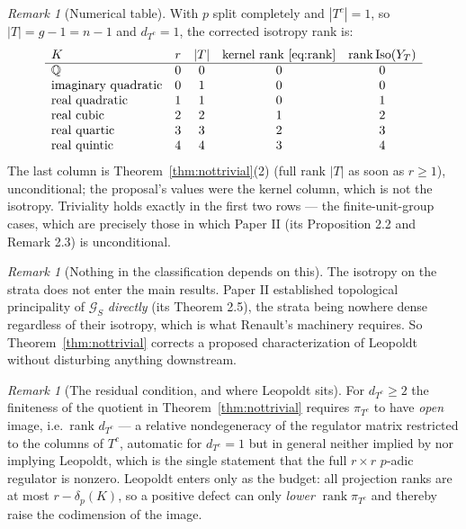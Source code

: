 \documentclass[11pt]{amsart}
\numberwithin{equation}{section}
\theoremstyle{definition}
\theoremstyle{remark}
\newtheorem{remark}[theorem]{Remark}
\newcommand{\Q}{\mathbb{Q}}
\newcommand{\cG}{\mathcal{G}}
\newcommand{\Iso}{\operatorname{Iso}}
\newcommand{\rank}{\operatorname{rank}}
\begin{document}
\begin{remark}[Numerical table]\label{rem:table}
With $p$ split completely and $|T^c|=1$, so $|T|=g-1=n-1$ and $d_{T^c}=1$, the corrected
isotropy rank is:
\[
\begin{array}{lcccc}
K & r & |T| & \text{kernel rank \eqref{eq:rank}} & \rank\Iso(Y_T)\\\hline
\Q & 0 & 0 & 0 & 0\\
\text{imaginary quadratic} & 0 & 1 & 0 & 0\\
\text{real quadratic} & 1 & 1 & 0 & 1\\
\text{real cubic} & 2 & 2 & 1 & 2\\
\text{real quartic} & 3 & 3 & 2 & 3\\
\text{real quintic} & 4 & 4 & 3 & 4
\end{array}
\]
The last column is Theorem~\ref{thm:nottrivial}(2) (full rank $|T|$ as soon as $r\ge1$),
unconditional; the proposal's values were the kernel column, which is not the isotropy.
Triviality holds exactly in the first two rows --- the finite-unit-group cases, which are
precisely those in which Paper II (its Proposition 2.2 and Remark 2.3) is unconditional.
\end{remark}

\begin{remark}[Nothing in the classification depends on this]\label{rem:nodependence}
The isotropy on the strata does not enter the main results. Paper II
established topological principality of $\cG_S$ \emph{directly} (its Theorem 2.5), the
strata being nowhere
dense regardless of their isotropy, which is what Renault's machinery requires. So
Theorem~\ref{thm:nottrivial} corrects a proposed characterization of Leopoldt without
disturbing anything downstream.
\end{remark}

\begin{remark}[The residual condition, and where Leopoldt sits]\label{rem:relative}
For $d_{T^c}\ge2$ the finiteness of the quotient in Theorem~\ref{thm:nottrivial} requires
$\pi_{T^c}$ to have \emph{open} image, i.e.\ rank $d_{T^c}$ --- a relative nondegeneracy of
the regulator matrix restricted to the columns of $T^c$, automatic for $d_{T^c}=1$ but in
general neither implied by nor implying Leopoldt, which is the single statement that the
full $r\times r$ $p$-adic regulator is nonzero. Leopoldt enters only as the budget: all
projection ranks are at most $r-\delta_p(K)$, so a positive defect can only \emph{lower}
$\rank\pi_{T^c}$ and thereby raise the codimension of the image.
\end{remark}
\end{document}
